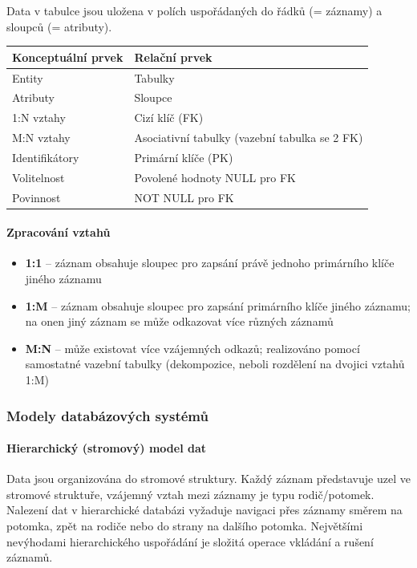 \documentclass[12pt,a4paper]{article}
\begin{document}
Data v tabulce jsou uložena v polích uspořádaných do řádků (= záznamy) a sloupců (= atributy).

\begin{center}
\begin{tabular}{ll}
\toprule
\textbf{Konceptuální prvek} & \textbf{Relační prvek} \\
\midrule
Entity & Tabulky \\
Atributy & Sloupce \\
1:N vztahy & Cizí klíč (FK) \\
M:N vztahy & Asociativní tabulky (vazební tabulka se 2 FK) \\
Identifikátory & Primární klíče (PK) \\
Volitelnost & Povolené hodnoty NULL pro FK \\
Povinnost & NOT NULL pro FK \\
\bottomrule
\end{tabular}
\end{center}

\paragraph{Zpracování vztahů}
\begin{itemize}
  \item \textbf{1:1} -- záznam obsahuje sloupec pro zapsání právě jednoho primárního klíče jiného záznamu
  \item \textbf{1:M} -- záznam obsahuje sloupec pro zapsání primárního klíče jiného záznamu; na onen jiný
    záznam se může odkazovat více různých záznamů
  \item \textbf{M:N} -- může existovat více vzájemných odkazů; realizováno pomocí samostatné vazební tabulky
    (dekompozice, neboli rozdělení na dvojici vztahů 1:M)
\end{itemize}

\subsubsection{Modely databázových systémů}

\paragraph{Hierarchický (stromový) model dat}
Data jsou organizována do stromové struktury. Každý záznam představuje uzel ve stromové struktuře,
vzájemný vztah mezi záznamy je typu rodič/potomek. Nalezení dat v hierarchické databázi vyžaduje
navigaci přes záznamy směrem na potomka, zpět na rodiče nebo do strany na dalšího potomka.
Největšími nevýhodami hierarchického uspořádání je složitá operace vkládání a rušení záznamů.
\end{document}
